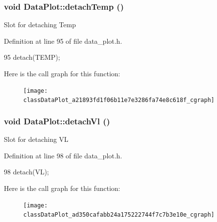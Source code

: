 \hypertarget{classDataPlot_a21893fd1f06b11e7e3286fa74e8c618f}{
\subsubsection[{detachTemp}]{\setlength{\rightskip}{0pt plus 5cm}void DataPlot::detachTemp ()}}
\label{classDataPlot_a21893fd1f06b11e7e3286fa74e8c618f}
Slot for detaching Temp 

Definition at line 95 of file data\_\-plot.h.




\begin{DoxyCode}
95 { detach(TEMP); }
\end{DoxyCode}




Here is the call graph for this function:\nopagebreak
\begin{figure}[H]
\begin{center}
\leavevmode
\texttt{[image: classDataPlot\_a21893fd1f06b11e7e3286fa74e8c618f\_cgraph]}
\end{center}
\end{figure}


\hypertarget{classDataPlot_ad350cafabb24a175222744f7c7b3e10e}{
\subsubsection[{detachVl}]{\setlength{\rightskip}{0pt plus 5cm}void DataPlot::detachVl ()}}
\label{classDataPlot_ad350cafabb24a175222744f7c7b3e10e}
Slot for detaching VL 

Definition at line 98 of file data\_\-plot.h.




\begin{DoxyCode}
98 { detach(VL); }
\end{DoxyCode}




Here is the call graph for this function:\nopagebreak
\begin{figure}[H]
\begin{center}
\leavevmode
\texttt{[image: classDataPlot\_ad350cafabb24a175222744f7c7b3e10e\_cgraph]}
\end{center}
\end{figure}


